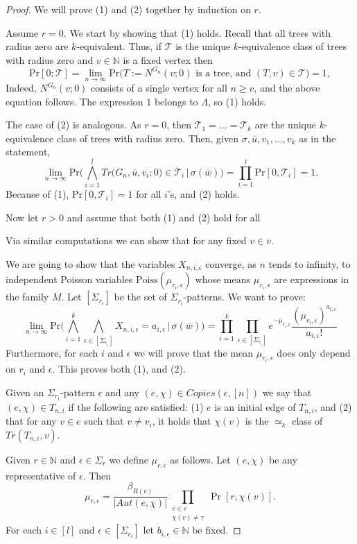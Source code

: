 \documentclass[12pt,notitlepage,a4paper]{article}
\theoremstyle{definition}
\newcommand{\N}{\mathbb{N}}
\newcommand{\Ln}{\lim\limits_{n\to \infty}}
\begin{document}
	\begin{proof}
		We will prove (1) and (2) together by induction on $r$. \par
		Assume $r=0$. We start by showing that (1) holds. Recall that
		all trees with radius zero are $k$-equivalent. Thus, if
		$\mathcal{T}$ is the unique $k$-equivalence class of trees
		with radius zero
		and $v\in \N$ is a fixed vertex then
		 \[
		 \mathrm{Pr}[0;\mathcal{T}] = \Ln \mathrm{Pr}\big( 
		 T:=N^{G_n}(v;0) \text{ is a tree, and } (T,v)\in \mathcal{T} \big)
		 =1, 
		 \]
		Indeed, $N^{G_n}(v;0)$ consists of a single vertex for all $n\geq v$,
		and the above equation follows. The expression $1$ belongs to 
		$\Lambda$, so (1) holds. \par
		The case of (2) is analogous. As $r=0$, then $\mathcal{T}_1=\dots=
		\mathcal{T}_k$ are the unique $k$-equivalence class of trees with
		radius zero. Then, given $\sigma, \overline{u}, v_1,\dots, v_k$ as
		in the statement,
		\[\Ln \mathrm{Pr}\big( \bigwedge_{i=1}^l
		Tr\big(G_n, \overline{u},v_i;0\big)\in \mathcal{T}_i \, | \, \sigma(\overline{w})
		\big)= \prod_{i=1}^l \mathrm{Pr}[0,\mathcal{T}_i]=1. \]	 	
		Because of (1), $\mathrm{Pr}[0,\mathcal{T}_i]=1$ for all $i$'s, 
		and (2) holds. \par
		Now let $r>0$ and assume that both (1) and (2) hold for all 

		Via similar computations we can show that for any fixed
		$v\in \overline{v}$.
		
		We are going to show that the variables $X_{n,i,\epsilon}$ converge, as
		$n$ tends to infinity, to independent Poisson variables 
		$\mathrm{Poiss}(\mu_{r_i,\epsilon})$ whose means $\mu_{r_i,\epsilon}$ 
		are expressions in the family $M$. Let $[\Sigma_{r_i}]$ be the set of
		$\Sigma_{r_i}$-patterns. We want to prove: 
		\begin{equation} \label{eqn:PoissonEdges}
		\Ln \mathrm{Pr}\Big(
		\bigwedge_{i=1}^k \bigwedge_{\epsilon \in [\Sigma_{r_i}]} X_{n,i,\epsilon}=a_{i,\epsilon}
		\, | \, \sigma(\overline{w})\Big) =
		\prod_{i=1}^k \prod_{\epsilon \in [\Sigma_{r_i}]} e^{-\mu_{r_i,\epsilon}}
		\frac{(\mu_{r_i,\epsilon})^{a_{i,\epsilon}}}{a_{i,\epsilon}!}
		\end{equation}
		Furthermore, for each $i$ and $\epsilon$ we will prove that the mean 
		$\mu_{r_i,\epsilon}$ does only depend on $r_i$ and $\epsilon$.
		This proves both (1), and (2).\par
		Given an $\Sigma_{r_i}$-pattern $\epsilon$ and any 
		$(e,\chi)\in Copies(\epsilon,[n])$ we say that $(e,\chi)\in T_{n,i}$
		if the following are satisfied: (1)	$e$ is an initial edge of $T_{n,i}$,
		and	(2) that for any $v\in e$ such that $v\neq v_i$, it holds that
		$\chi(v)$ is the $\simeq_k$ class of $Tr(T_{n,i},v)$.\par 
		Given $r\in \N$ and $\epsilon\in \Sigma_{r}$
		we define
		$\mu_{r,\epsilon}$ as follows. Let $(e,\chi)$ be any representative of
		$\epsilon$. Then
		\[\mu_{r,\epsilon}=  \frac{\beta_{R(e)}}{|Aut(e,\chi)|}
		\prod_{\substack{v\in e\\ \chi(v)\neq \tau }} \Pr[r,\chi(v)]. \]
		For each $i\in [l]$ and $\epsilon\in [\Sigma_{r_i}]$ let 		
		$b_{i,\epsilon}\in \N$ be fixed. 
	

\end{proof}
\end{document}
